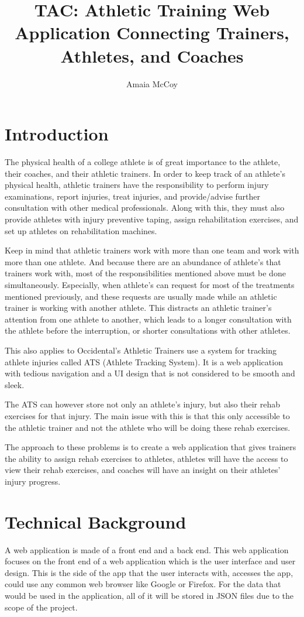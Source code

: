 \documentclass[10pt,twocolumn]{article}
\title{TAC: Athletic Training Web Application Connecting Trainers, Athletes, and Coaches
}
\author{Amaia McCoy}
\affiliation{Occidental College}
\begin{document}
\maketitle

\section{Introduction}
The physical health of a college athlete is of great importance to the athlete, their coaches, and their athletic trainers. In order to keep track of an athlete's physical health, athletic trainers have the responsibility to perform  injury examinations, report injuries, treat injuries, and provide/advise further consultation with other medical professionals. Along with this, they must also provide athletes with injury preventive taping, assign rehabilitation exercises, and set up athletes on rehabilitation machines. 

Keep in mind that athletic trainers work with more than one team and work with more than one athlete. And because there are an abundance of athlete's that trainers work with, most of the responsibilities mentioned above must be done simultaneously. Especially, when athlete's can request for most of the treatments mentioned previously, and these requests are usually made while an athletic trainer is working with another athlete. This distracts an athletic trainer's attention from one athlete to another, which leads to a longer consultation with the athlete before the interruption, or shorter consultations with other athletes.

This also applies to Occidental’s Athletic Trainers use a system for tracking athlete injuries called ATS (Athlete Tracking System). It is a web application with tedious navigation and a UI design that is not considered to be smooth and sleek. 

The ATS can however store not only an athlete’s injury, but also their rehab exercises for that injury. The main issue with this is that this only accessible to the athletic trainer and not the athlete who will be doing these rehab exercises.

The approach to these problems is to create a web application that gives trainers the ability to assign rehab exercises to athletes, athletes will have the access to view their rehab exercises, and coaches will have an insight on their athletes’ injury progress.

\section{Technical Background}
A web application is made of a front end and a back end. This web application focuses on the front end of a web application which is the user interface and user design. This is the side of the app that the user interacts with, accesses the app, could use any common web browser like Google or Firefox. For the data that would be used in the application, all of it will be stored in JSON files due to the scope of the project.
\end{document}
